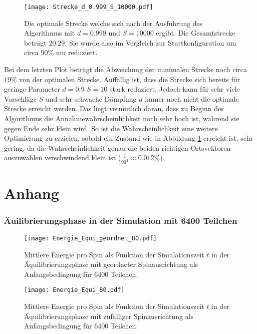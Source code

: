 \FloatBarrier
\noindent
\FloatBarrier
\begin{figure}[H]
    \centering
    \texttt{[image: Strecke\_d\_0.999\_S\_10000.pdf]}
    \caption{Die optimale Strecke welche sich nach der Ausführung des Algorithmus mit $d=0.999$ und $S=10000$ ergibt. 
    Die Gesamtstrecke beträgt $20.29$. Sie wurde also im Vergleich zur Startkonfiguration um circa $90\%$ um reduziert.}
    \label{fig:3_6}
\end{figure}
\FloatBarrier
\noindent
Bei dem letzten Plot beträgt die Abweichung der minimalen Strecke noch circa $19\%$ von der optimalen Strecke.
Auffällig ist, dass die Strecke sich bereits für geringe Parameter $d=0.9$ $S=10$ stark reduziert.
Jedoch kann für sehr viele Vorschläge $S$ und sehr schwache Dämpfung $d$ immer noch nicht die optimale Strecke erreicht werden.
Das liegt vermutlich daran, dass zu Beginn des Algorithmus die Annahmewahrscheinlichkeit noch sehr hoch ist, während sie gegen Ende sehr klein wird.
So ist die Wahrscheinlichkeit eine weitere Optimierung zu erzielen, sobald ein Zustand wie in Abbildung \ref{fig:3_6} erreicht ist, sehr gering, da die Wahrscheinlichkeit genau die beiden richtigen Ortsvektoren auszuwählen verschwindend klein ist ($\frac{1}{90^2} \approx 0.012\%$).

\section*{Anhang}
\label{sec:anhang}
\subsubsection*{Äuilibrierungsphase in der Simulation mit 6400 Teilchen}
\FloatBarrier
\begin{figure}[H]
    \centering
    \texttt{[image: Energie\_Equi\_geordnet\_80.pdf]}
    \caption{Mittlere Energie pro Spin als Funktion der Simulationszeit $t$ in der Äquilibrierungsphase mit geordneter Spinausrichtung als Anfangsbedingung für 6400 Teilchen.}
    \label{fig:anhang_1}
\end{figure}
\begin{figure}[H]
    \centering
    \texttt{[image: Energie\_Equi\_80.pdf]}
    \caption{Mittlere Energie pro Spin als Funktion der Simulationszeit $t$ in der Äquilibrierungsphase mit zufälliger Spinausrichtung als Anfangsbedingung für 6400 Teilchen.}
    \label{fig:anhang_2}
\end{figure}
\FloatBarrier
\noindent

